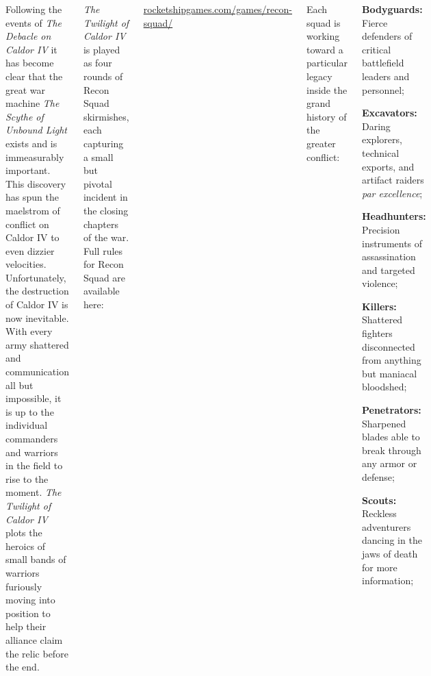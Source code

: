 \clearpage
{}

\begin{columns}

  Following the events of \emph{The Debacle on Caldor IV} it has
  become clear that the great war machine \emph{The Scythe of Unbound
    Light} exists and is immeasurably important.  This discovery has
  spun the maelstrom of conflict on Caldor IV to even dizzier
  velocities.  Unfortunately, the destruction of Caldor IV is now
  inevitable.  With every army shattered and communication all but
  impossible, it is up to the individual commanders and warriors in
  the field to rise to the moment.  \emph{The Twilight of Caldor IV}
  plots the heroics of small bands of warriors furiously moving into
  position to help their alliance claim the relic before the end.


\emph{The Twilight of Caldor IV} is played as four rounds of Recon
Squad skirmishes, each capturing a small but pivotal incident in the
closing chapters of the war.  Full rules for Recon Squad are available
here:

\centerline{\url{rocketshipgames.com/games/recon-squad/}}

\smallskip%
Each squad is working toward a particular legacy inside the grand
history of the greater conflict:

\begin{squishitemize}
\item \textbf{Bodyguards:} Fierce defenders of critical battlefield
  leaders and personnel;

\item \textbf{Excavators:} Daring explorers, technical exports, and
  artifact raiders \emph{par excellence};

\item \textbf{Headhunters:} Precision instruments of assassination and
  targeted violence;

\item \textbf{Killers:} Shattered fighters disconnected from anything
  but maniacal bloodshed;

\item \textbf{Penetrators:} Sharpened blades able to break through any
  armor or defense;

\item \textbf{Scouts:} Reckless adventurers dancing in the jaws of
  death for more information;


\end{squishitemize}
\end{columns}
